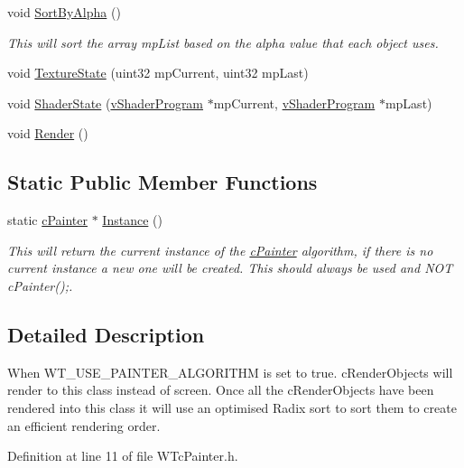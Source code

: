 \begin{DoxyCompactItemize}
void \hyperlink{classc_painter_aa94ad2ace4bb757245e20aa6f3983ab4}{SortByAlpha} ()
\begin{DoxyCompactList}\small\item\em This will sort the array mpList based on the alpha value that each object uses. \item\end{DoxyCompactList}\item 
void \hyperlink{classc_painter_ad88e9a81b90b044e0a93f26cf92efe98}{TextureState} (uint32 mpCurrent, uint32 mpLast)
\item 
void \hyperlink{classc_painter_a1d4ecd48a9b508962a340f95c65bd044}{ShaderState} (\hyperlink{classv_shader_program}{vShaderProgram} $\ast$mpCurrent, \hyperlink{classv_shader_program}{vShaderProgram} $\ast$mpLast)
\item 
void \hyperlink{classc_painter_a38adbfdd43c6951d86592f539f2dc034}{Render} ()
\end{DoxyCompactItemize}
\subsection*{Static Public Member Functions}
\begin{DoxyCompactItemize}
\item 
static \hyperlink{classc_painter}{cPainter} $\ast$ \hyperlink{classc_painter_a0ad633317beac0e412434548ccbe8995}{Instance} ()
\begin{DoxyCompactList}\small\item\em This will return the current instance of the \hyperlink{classc_painter}{cPainter} algorithm, if there is no current instance a new one will be created. This should always be used and NOT cPainter();. \item\end{DoxyCompactList}\end{DoxyCompactItemize}


\subsection{Detailed Description}
When WT\_\-USE\_\-PAINTER\_\-ALGORITHM is set to true. cRenderObjects will render to this class instead of screen. Once all the cRenderObjects have been rendered into this class it will use an optimised Radix sort to sort them to create an efficient rendering order. 

Definition at line 11 of file WTcPainter.h.



